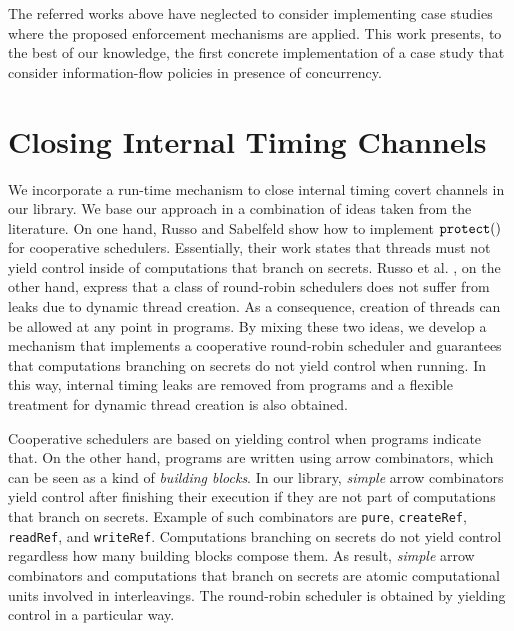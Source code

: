 \documentclass[times, 10pt,twocolumn]{article}
\begin{document}
The referred works above have neglected to consider implementing 
case studies where the proposed enforcement mechanisms are applied. 
This work presents, 
to the best of our knowledge, the first concrete
implementation of a case study that consider 
information-flow policies in presence of concurrency.

\section{Closing Internal Timing Channels} \label{sec:implementing-concurrency}

We incorporate a run-time mechanism to close internal
timing covert channels in our library. 
We base our approach in a combination of ideas 
taken from the literature.
On one hand, Russo and Sabelfeld \cite{Russo:Sabelfeld:PSI06}
show how to implement $\mathtt{protect}()$ for cooperative schedulers.
Essentially, their work states that threads must not  
yield control inside of computations that branch on secrets. 
Russo et al. \cite{Russo:Hughes:Naumann:Sabelfeld:ASIAN06}, 
on the other hand, express that a class of round-robin schedulers does 
not suffer from leaks due to dynamic thread creation. As a consequence, 
creation of threads can be allowed at any point in programs.
By mixing these two ideas, we develop a mechanism 
that implements a cooperative round-robin scheduler 
and guarantees that computations branching 
on secrets do not yield control when running. 
In this way, internal timing leaks are removed from programs
and a flexible treatment for dynamic thread creation is also 
obtained.


Cooperative schedulers are based on yielding control when 
programs indicate that. On the other hand, programs are written 
using arrow combinators, which can be seen as a kind of \emph{building
  blocks}.  In our library, \emph{simple} arrow combinators  
yield control after finishing their execution if 
they are not part of computations that branch on secrets. 
Example of such combinators are \texttt{pure}, \texttt{createRef}, 
\texttt{readRef}, and \texttt{writeRef}.
Computations branching on secrets do not yield control 
regardless how many building blocks compose them.
As result, \emph{simple} arrow combinators  and computations that branch 
on secrets are atomic computational units involved in
interleavings. The round-robin scheduler is obtained 
by yielding control in a particular way. 
\end{document}
